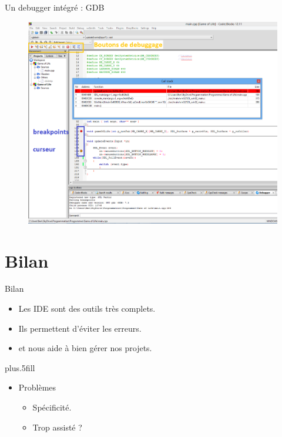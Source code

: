 \documentclass{beamer}
\begin{document}
\begin{frame}{Un debugger intégré : GDB}
\begin{figure}
\includegraphics[scale=0.25]{../images/cb07.png}
\label{cb07}				
\end{figure}
\end{frame}


\section*{Bilan}

\begin{frame}{Bilan}

  \begin{itemize}
  \item
    Les IDE sont des outils \alert{très complets}.
  \item
    Ils permettent \alert{d'éviter les erreurs}.
  \item
    et nous aide à \alert{bien gérer nos projets}.
  \end{itemize}
  
  \vskip0pt plus.5fill
  \begin{itemize}
  \item
    Problèmes
    \begin{itemize}
    \item
      Spécificité.
    \item
      Trop assisté ?
    \end{itemize}
  \end{itemize}
\end{frame}
\end{document}
